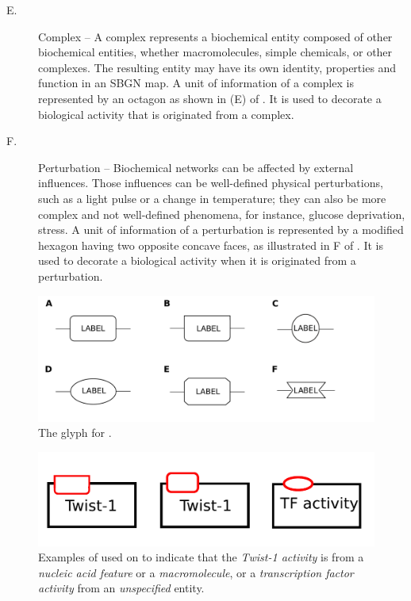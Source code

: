 \begin{glyphDescription}
\begin{description}
\item[E.] Complex -- A complex represents a biochemical entity composed of other biochemical entities, whether macromolecules, simple chemicals, or other complexes. The resulting entity may 
have its own identity, properties and function in an SBGN map. A unit of information of a complex is represented by an octagon as shown in (E) of .  It is used to decorate a biological activity that is originated from a complex.

\item[F.] Perturbation -- Biochemical networks can be affected by external influences. Those influences can be well-defined physical perturbations, such as a light pulse or a change in temperature; they can also be more complex and not well-defined phenomena, for instance, glucose deprivation, stress.  A unit of information of a perturbation is represented by a modified hexagon
having two opposite concave faces, as illustrated in F of  .  It is used to decorate a biological activity when it is originated from a perturbation.
\end{description}

\begin{figure}[H]
  \centering
  \includegraphics[scale = 0.2]{images/build/unitInformation_ba.pdf}
  \caption{The \AF glyph for .}
  \label{fig:af:unitInfo}
\end{figure}

\begin{figure}[H]
  \centering
  \includegraphics[scale = 0.5]{images/build/unitofinformation.pdf}
  \caption{Examples of  used on  to indicate that the \emph{Twist-1 activity} is from a \emph{nucleic acid feature} or a \emph{macromolecule}, or a \emph{transcription factor activity} from an \emph{unspecified} entity.}
  \label{fig:af:unitofinfo}
\end{figure}


\end{glyphDescription}
